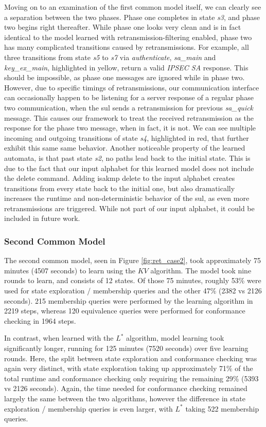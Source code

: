 Moving on to an examination of the first common model itself, we can clearly see a separation between the two phases. Phase one completes in state \emph{s3}, and phase two begins right thereafter. While phase one looks very clean and is in fact identical to the model learned with retransmission-filtering enabled, phase two has many complicated transitions caused by retransmissions. For example, all three transitions from state \emph{s5} to \emph{s7} via \emph{authenticate}, \emph{sa\_main} and \emph{key\_ex\_main}, highlighted in yellow, return a valid \emph{IPSEC SA} response. This should be impossible, as phase one messages are ignored while in phase two. However, due to specific timings of retransmissions, our communication interface can occasionally happen to be listening for a server response of a regular phase two communication, when the \ac{sul} sends a retransmission for previous \emph{sa\_quick} message. This causes our framework to treat the received retransmission as the response for the phase two message, when in fact, it is not. We can see multiple incoming and outgoing transitions of state \emph{s4}, highlighted in red, that further exhibit this same same behavior.
Another noticeable property of the learned automata, is that past state \emph{s2}, no paths lead back to the initial state. This is due to the fact that our input alphabet for this learned model does not include the delete command. Adding \ac{isakmp} delete to the input alphabet creates transitions from every state back to the initial one, but also dramatically increases the runtime and non-deterministic behavior of the \ac{sul}, as even more retransmissions are triggered. While not part of our input alphabet, it could be included in future work.


\subsubsection*{Second Common Model}

The second common model, seen in Figure \ref{fig:ret_case2}, took approximately 75 minutes (4507 seconds) to learn using the $KV$ algorithm. The model took nine rounds to learn, and consists of 12 states. Of those 75 minutes, roughly 53\% were used for state exploration / membership queries and the other 47\% (2382 vs 2126 seconds). 215 membership queries were performed by the learning algorithm in 2219 steps, whereas 120 equivalence queries were performed for conformance checking in 1964 steps. 

In contrast, when learned with the $L^*$ algorithm, model learning took significantly longer, running for 125 minutes (7520 seconds) over five learning rounds. Here, the split between state exploration and conformance checking was again very distinct, with state exploration taking up approximately 71\% of the total runtime and conformance checking only requiring the remaining 29\% (5393 vs 2126 seconds). Again, the time needed for conformance checking remained largely the same between the two algorithms, however the difference in state exploration / membership queries is even larger, with $L^*$ taking 522 membership queries.


